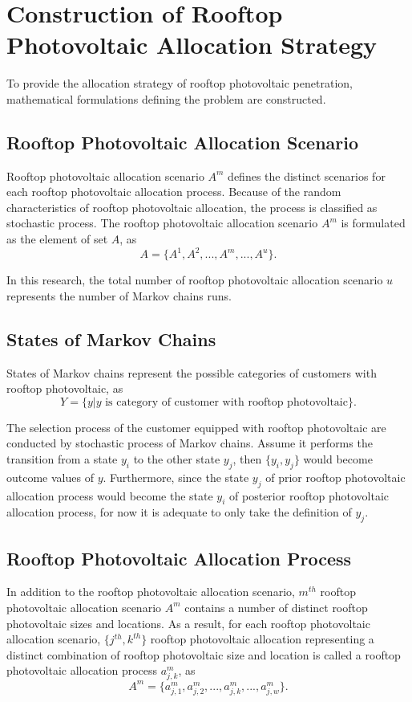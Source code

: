 \section{Construction of Rooftop Photovoltaic Allocation Strategy}
To provide the allocation strategy of rooftop photovoltaic penetration, mathematical formulations defining the problem are constructed.
\subsection{Rooftop Photovoltaic Allocation Scenario}
Rooftop photovoltaic allocation scenario $A^m$ defines the distinct scenarios for each rooftop photovoltaic allocation process. Because of the random characteristics of rooftop photovoltaic allocation, the process is classified as stochastic process. The rooftop photovoltaic allocation scenario $A^m$ is formulated as the element of set $A$, as
\begin{equation}\label{pas1}
A=\{A^1,A^2,...,A^m,...,A^u\}.
\end{equation}

In this research, the total number of rooftop photovoltaic allocation scenario $u$ represents the number of Markov chains runs.
\subsection{States of Markov Chains}
States of Markov chains represent the possible categories of customers with rooftop photovoltaic, as
\begin{equation}\label{smc1}
Y=\{y|y \text{ is category of customer with rooftop photovoltaic}\}.
\end{equation} 

The selection process of the customer equipped with rooftop photovoltaic are conducted by stochastic process of Markov chains. Assume it performs the transition from a state $y_i$ to the other state $y_j$, then $\{y_i,y_j\}$ would become outcome values of $y$. Furthermore, since the state $y_j$ of prior rooftop photovoltaic allocation process would become the state $y_i$ of posterior rooftop photovoltaic allocation process, for now it is adequate to only take the definition of $y_j$.
\subsection{Rooftop Photovoltaic Allocation Process}
In addition to the rooftop photovoltaic allocation scenario, $m^{th}$ rooftop photovoltaic allocation scenario $A^m$ contains a number of distinct rooftop photovoltaic sizes and locations. As a result, for each rooftop photovoltaic allocation scenario, $\{j^{th},k^{th}\}$ rooftop photovoltaic allocation representing a distinct combination of rooftop photovoltaic size and location is called a rooftop photovoltaic allocation process $a^m_{j,k}$, as
\begin{equation}\label{pas2}
A^m=\{a^m_{j,1},a^m_{j,2},...,a^m_{j,k},...,a^m_{j,w}\}.
\end{equation} 

